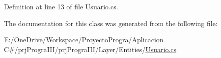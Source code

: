 Definition at line 13 of file Usuario.\+cs.



The documentation for this class was generated from the following file\+:\begin{DoxyCompactItemize}
\item 
E\+:/\+One\+Drive/\+Workspace/\+Proyecto\+Progra/\+Aplicacion C\#/prj\+Progra\+I\+I\+I/prj\+Progra\+I\+I\+I/\+Layer/\+Entities/\hyperlink{_usuario_8cs}{Usuario.\+cs}\end{DoxyCompactItemize}
